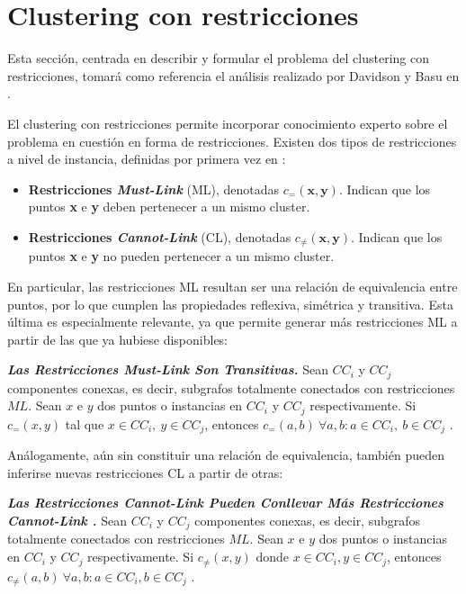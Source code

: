 \section{Clustering con restricciones}

Esta sección, centrada en describir y formular el problema del clustering con restricciones, tomará como referencia el análisis realizado por Davidson y Basu en \cite{davidson2007survey}.

El clustering con restricciones permite incorporar conocimiento experto sobre el problema en cuestión en forma de restricciones. Existen dos tipos de restricciones a nivel de instancia, definidas por primera vez en \cite{wagstaff2000clustering}:
\begin{itemize}
	\item \textbf{Restricciones \emph{Must-Link}} (ML), denotadas $c_{=}(\textbf{x},\textbf{y})$. Indican que los puntos \textbf{x} e \textbf{y} deben pertenecer a un mismo cluster.
	\item \textbf{Restricciones \emph{Cannot-Link}} (CL), denotadas $c_{\not=}(\textbf{x},\textbf{y})$. Indican que los puntos \textbf{x} e \textbf{y} no pueden pertenecer a un mismo cluster.
\end{itemize}

En particular, las restricciones ML resultan ser una relación de equivalencia entre puntos, por lo que cumplen las propiedades reflexiva, simétrica y transitiva. Esta última es especialmente relevante, ya que permite generar más restricciones ML a partir de las que ya hubiese disponibles:

\begin{observacion}
	\textbf{\emph{Las Restricciones \emph{Must-Link} Son Transitivas.}} Sean $CC_i$ y $CC_j$ componentes conexas, es decir, subgrafos totalmente conectados con restricciones $ML$. Sean $x$ e $y$ dos puntos o instancias en $CC_i$ y $CC_j$ respectivamente. Si $c_{=}(x,y)$ tal que $x \in CC_i,~y \in CC_j$,  entonces $c_{=}(a,b)~\forall a,b: a\in CC_i,~b \in CC_j$ \cite{davidson2007survey} \cite{basu2008constrained}. 
\end{observacion}

Análogamente, aún sin constituir una relación de equivalencia, también pueden inferirse nuevas restricciones CL a partir de otras:

\begin{observacion}
	\textbf{\emph{Las Restricciones \emph{Cannot-Link} Pueden Conllevar Más Restricciones \emph{Cannot-Link} .}} Sean $CC_i$ y $CC_j$ componentes conexas, es decir, subgrafos totalmente conectados con restricciones $ML$. Sean $x$ e $y$ dos puntos o instancias en $CC_i$ y $CC_j$ respectivamente. Si $c_{\not=}(x,y)$ donde $x \in CC_i, y \in CC_j$, entonces $c_{\not=}(a,b)~\forall a,b: a\in CC_i, b \in CC_j$ \cite{davidson2007survey} \cite{basu2008constrained}.
\end{observacion}

